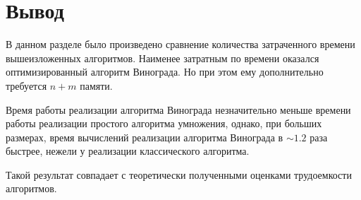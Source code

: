 \section*{Вывод}
В данном разделе было произведено сравнение количества затраченного вре­мени вышеизложенных алгоритмов.
Наименее затратным по времени оказался оптимизированный алгоритм Винограда.
Но при этом ему дополнительно требуется $n+m$ памяти.

Время работы реализации алгоритма Винограда незначительно меньше времени работы реализации простого алгоритма умножения, однако, при больших размерах, время вычислений реализации алгоритма Винограда в $\sim 1.2$ раза быстрее, нежели у реализации классического алгоритма.

Такой результат совпадает с теоретически полученными оценками трудоемкости алгоритмов.
